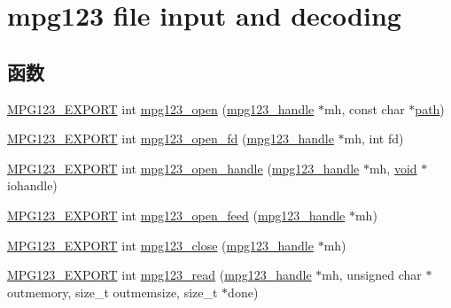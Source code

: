 \hypertarget{group__mpg123__input}{}\section{mpg123 file input and decoding}
\label{group__mpg123__input}
\subsection*{函数}
\begin{DoxyCompactItemize}
\item 
\hyperlink{mpg123_8h_a2ba98cfba3f760879df70e755b2a61cc}{M\+P\+G123\+\_\+\+E\+X\+P\+O\+RT} int \hyperlink{group__mpg123__input_ga8f74d35cf61667a791b507c76c22a29b}{mpg123\+\_\+open} (\hyperlink{group__mpg123__init_ga6728e2839a395f3a07d4514da659faca}{mpg123\+\_\+handle} $\ast$mh, const char $\ast$\hyperlink{structpath}{path})
\item 
\hyperlink{mpg123_8h_a2ba98cfba3f760879df70e755b2a61cc}{M\+P\+G123\+\_\+\+E\+X\+P\+O\+RT} int \hyperlink{group__mpg123__input_ga969c0cbe49b3831e18ad9e9e45c9d83e}{mpg123\+\_\+open\+\_\+fd} (\hyperlink{group__mpg123__init_ga6728e2839a395f3a07d4514da659faca}{mpg123\+\_\+handle} $\ast$mh, int fd)
\item 
\hyperlink{mpg123_8h_a2ba98cfba3f760879df70e755b2a61cc}{M\+P\+G123\+\_\+\+E\+X\+P\+O\+RT} int \hyperlink{group__mpg123__input_gaadda450ea307f88589cb77ffda0754ab}{mpg123\+\_\+open\+\_\+handle} (\hyperlink{group__mpg123__init_ga6728e2839a395f3a07d4514da659faca}{mpg123\+\_\+handle} $\ast$mh, \hyperlink{interfacevoid}{void} $\ast$iohandle)
\item 
\hyperlink{mpg123_8h_a2ba98cfba3f760879df70e755b2a61cc}{M\+P\+G123\+\_\+\+E\+X\+P\+O\+RT} int \hyperlink{group__mpg123__input_ga072669ae9bde29eea8cffa4be10c7345}{mpg123\+\_\+open\+\_\+feed} (\hyperlink{group__mpg123__init_ga6728e2839a395f3a07d4514da659faca}{mpg123\+\_\+handle} $\ast$mh)
\item 
\hyperlink{mpg123_8h_a2ba98cfba3f760879df70e755b2a61cc}{M\+P\+G123\+\_\+\+E\+X\+P\+O\+RT} int \hyperlink{group__mpg123__input_ga156eb0774196db868485662dc31621af}{mpg123\+\_\+close} (\hyperlink{group__mpg123__init_ga6728e2839a395f3a07d4514da659faca}{mpg123\+\_\+handle} $\ast$mh)
\item 
\hyperlink{mpg123_8h_a2ba98cfba3f760879df70e755b2a61cc}{M\+P\+G123\+\_\+\+E\+X\+P\+O\+RT} int \hyperlink{group__mpg123__input_ga8023e3b24e8a70d9589c6c7567c54a41}{mpg123\+\_\+read} (\hyperlink{group__mpg123__init_ga6728e2839a395f3a07d4514da659faca}{mpg123\+\_\+handle} $\ast$mh, unsigned char $\ast$outmemory, size\+\_\+t outmemsize, size\+\_\+t $\ast$done)

\end{DoxyCompactItemize}

